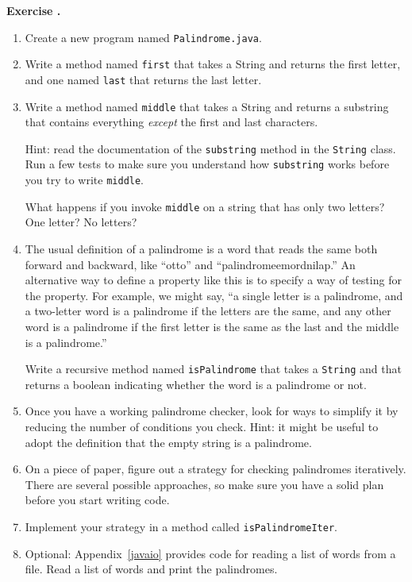 \documentclass{book}
\newcounter{exercisenum}
\renewcommand{\theexercisenum}{{\thechapter}.\arabic{exercisenum}}
\newenvironment{exercisesize}{\begin{small}}{\end{small}}
\newcommand{\exerciseheader}[2]{                                          
     
  \begin{exercisesize}                                                    
     
     
  \def\theenumi{\alph{enumi}}                                             
  \def\labelenumi{\theenumi.}                                             
  \def\theenumii{\roman{enumii}}                                          
  \def\labelenumii{\theenumii.}                                           
  {\bf Exercise {#1}{#2}}\hspace{0.1in}                 
}
\newcommand{\startexercise}[1]{%
  \refstepcounter{exercisenum}                                            
  \exerciseheader{\theexercisenum}{#1}                                    
}
\newcommand{\stopexercise}{%
  {\hfill}                                                               
  \end{exercisesize}      
}
\newcommand{\normaldif}{}
\newenvironment{exercise}{\startexercise{\normaldif{}}}{\stopexercise}
\begin{document}
\begin{exercise}
\begin{enumerate}

\item Create a new program named {\tt Palindrome.java}.

\item Write a method named {\tt first}
that takes a String and returns the first letter, and one named
{\tt last} that returns the last letter.

\item Write a method named {\tt middle} that takes a String and
returns a substring that contains everything {\em except} the
first and last characters.

Hint: read the documentation of the {\tt substring} method in
the {\tt String} class.
Run a few tests to make sure you understand how {\tt substring} works
before you try to write {\tt middle}.

What happens if you invoke {\tt middle} on a string that has only
two letters?  One letter?  No letters?

\item The usual definition of a palindrome is a word that reads the
same both forward and backward, like ``otto'' and
``palindromeemordnilap.''  An alternative way to define a property
like this is to specify a way of testing for the property.  For
example, we might say, ``a single letter is a palindrome, and a
two-letter word is a palindrome if the letters are the same, and
any other word is a palindrome if
the first letter is the same as the
last and the middle is a palindrome.''

Write a recursive method named {\tt isPalindrome} that takes
a {\tt String} and that returns a boolean indicating whether the
word is a palindrome or not.

\item Once you have a working palindrome checker, look for ways
to simplify it by reducing the number of conditions you check.
Hint: it might be useful to adopt the definition that the empty
string is a palindrome.

\item On a piece of paper, figure out a strategy for checking
palindromes iteratively.  There are several possible approaches,
so make sure you have a solid plan before you start writing code.

\item Implement your strategy in a method called {\tt isPalindromeIter}.

\item Optional: Appendix~\ref{javaio} provides code for reading a list
of words from a file.  Read a list of words and print the palindromes.

\end{enumerate}
\end{exercise}
\end{document}
